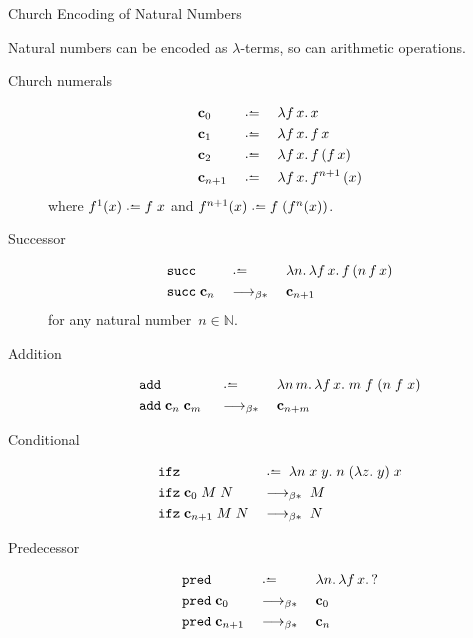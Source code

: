 \begin{frame}[allowframebreaks]{Church Encoding of Natural Numbers}

  Natural numbers can be encoded as $\lambda$-terms, so can arithmetic operations. 
  \begin{description}
    \item[Church numerals] 
      \begin{align*}
        &\bc_0 &&\defeq\;&& \lambda f\,x.\, x \\
        &\bc_{1} &&\defeq\;&& \lambda f\,x.\, f\,x \\
        &\bc_{2} &&\defeq\;&& \lambda f\,x.\, f\,(f\,x) \\
        &\bc_{n+1} &&\defeq\;&& \lambda f\,x.\, f^{n+1}\,(x)
      \end{align*}
      where $f^1(x) \defeq f\;x$ and $f^{n+1}(x)  \defeq f\;(f^n(x))$.
    \item[Successor]
      \begin{align*}
        & \mathtt{succ} && \defeq\; && \lambda n.\,\lambda f\,x.\, f\,(n\,f\,x) \\
        & \mathtt{succ}\;\bc_n && \reduce\; && \bc_{n+1}
      \end{align*}
      for any natural number~$n \in \mathbb{N}$.
    \item[Addition]
      \begin{align*}
        & \mathtt{add} && \defeq\; && \lambda n\,m.\,\lambda f\,x.\;
        m\;f\;(n\;f\;x)  \\ & \mathtt{add}\;\bc_{n}\;\bc_{m}\;
                            && \reduce\; && \bc_{n + m}
      \end{align*}
  \end{description}


  \begin{description}
    \item[Conditional]
      \begin{align*}
        & \mathtt{ifz} && \defeq \; \lambda n\;x\;y.\;n\;(\lambda z.\;y)\;x 
        \\
        & \mathtt{ifz}\;\bc_0\;M\;N && \reduce \; M \\
        & \mathtt{ifz}\;\bc_{n+1}\;M\;N && \reduce \; N
      \end{align*}
    \item[Predecessor]
      \begin{align*}
        & \mathtt{pred} && \defeq\; && \lambda n.\, \lambda f\,x.\, ? \\
        & \mathtt{pred}\;\bc_{0}  && \reduce\; && \bc_{0} \\
        & \mathtt{pred}  \;\bc_{n+1} && \reduce\; && \bc_{n}
      \end{align*}
  \end{description}
\end{frame}

